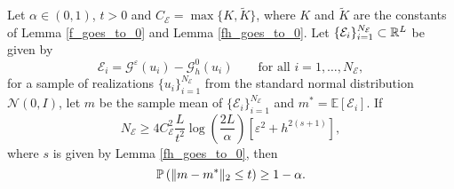 \begin{proposition}
\label{inequality_modelling_error}
Let $\alpha \in (0,1)$, $t > 0$ and $C_{\mathcal{E}} = \max \{ K, \tilde{K} \}$, where $K$ and $\tilde{K}$ are the constants of Lemma \ref{f_goes_to_0} and Lemma \ref{fh_goes_to_0}. Let $\{ \mathcal{E}_i \}_{i=1}^{N_{\mathcal{E}}} \subset \mathbb{R}^L$ be given by
\[ \mathcal{E}_i = \mathcal{G}^{\varepsilon}(u_i) - \mathcal{G}^0_h(u_i) \qquad \text{for all } i = 1, \dots, N_{\mathcal{E}}, \]
for a sample of realizations $\{ u_i \}_{i=1}^{N_{\mathcal{E}}}$ from the standard normal distribution $\mathcal{N}(0,I)$, let $m$ be the sample mean of $\{\mathcal E_i\}_{i=1}^{N_{\mathcal E}}$ and $m^* = \mathbb{E}[\mathcal{E}_i]$. If
\[ N_{\mathcal{E}} \ge 4 C_{\mathcal{E}}^2 \frac{L}{t^2} \log \left ( \frac{2L}{\alpha} \right ) \left [ \varepsilon^2 + h^{2(s+1)} \right ], \]
where $s$ is given by Lemma \ref{fh_goes_to_0}, then
\[ \mathbb{P} \left ( \lVert m - m^*\rVert_2 \le t \right ) \ge 1 - \alpha. \]
\end{proposition}
